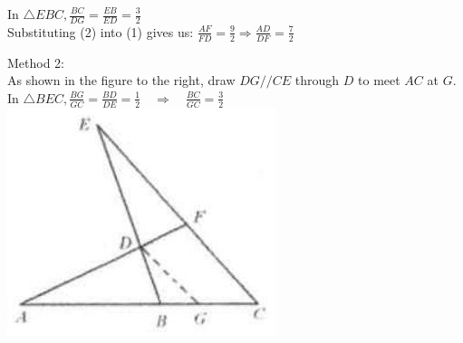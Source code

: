 \documentclass[10pt]{article}
\begin{document}
In \(\triangle E B C, \frac{B C}{D G}=\frac{E B}{E D}=\frac{3}{2}\)\\
Substituting (2) into (1) gives us: \(\frac{A F}{F D}=\frac{9}{2} \Rightarrow \frac{A D}{D F}=\frac{7}{2}\)

Method 2:\\
As shown in the figure to the right, draw \(D G / / C E\) through \(D\) to meet \(A C\) at \(G\).\\
In \(\triangle B E C, \frac{B G}{G C}=\frac{B D}{D E}=\frac{1}{2} \quad \Rightarrow \quad \frac{B C}{G C}=\frac{3}{2}\)\\
\includegraphics[max width=\textwidth, center]{2025_04_17_97bc1f7e44d93c271a88g-111(1)}
\end{document}
